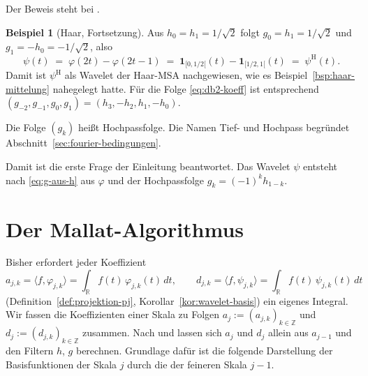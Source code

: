 \documentclass[a4paper,11pt,bibliography=totoc,listof=totoc,headinclude=true,cleardoublepage=empty,oneside]{scrbook}
\newcommand{\quellen}[1]{%
  \par\smallskip
  {\color{uhh_blue}\small\textbf{Belegstellen.}\ #1}%
  \par\medskip}
\theoremstyle{plain}
\theoremstyle{definition}
\newtheorem{Beispiel}[Satz]{Beispiel}
\newcommand{\R}{\mathbb{R}}
\newcommand{\Z}{\mathbb{Z}}
\newcommand{\scal}[2]{\langle #1, #2 \rangle}
\begin{document}
Der Beweis steht bei \cite[Satz~2.2.10]{lmr}. %

\begin{Beispiel}[Haar, Fortsetzung]
\label{bsp:haar-g}
Aus $h_0=h_1=1/\sqrt2$ folgt $g_0 = h_1 = 1/\sqrt2$ und $g_1 = -h_0 = -1/\sqrt2$,
also
\[
  \psi(t) \;=\; \varphi(2t) - \varphi(2t-1) \;=\; \mathbf 1_{[0,1/2[}(t) - \mathbf 1_{[1/2,1[}(t)
  \;=\; \psi^{\mathrm H}(t).
\]
Damit ist $\psi^{\mathrm H}$ als Wavelet der Haar-MSA nachgewiesen, wie es
Beispiel~\ref{bsp:haar-mittelung} nahegelegt hatte. Für die Folge
\eqref{eq:db2-koeff} ist entsprechend
$(g_{-2},g_{-1},g_0,g_1) = (h_3,-h_2,h_1,-h_0)$.
\end{Beispiel}

Die Folge $(g_k)$ hei\ss{}t Hochpassfolge. Die Namen Tief- und Hochpass
begründet Abschnitt~\ref{sec:fourier-bedingungen}.

Damit ist die erste Frage der Einleitung beantwortet. Das Wavelet $\psi$
entsteht nach \eqref{eq:g-aus-h} aus $\varphi$ und der Hochpassfolge
$g_k = (-1)^k h_{1-k}$.

\section{Der Mallat-Algorithmus}
\label{sec:mallat}


Bisher erfordert jeder Koeffizient
\[
  a_{j,k} = \scal{f}{\varphi_{j,k}} = \int_{\R} f(t)\,\varphi_{j,k}(t)\,dt,
  \qquad
  d_{j,k} = \scal{f}{\psi_{j,k}} = \int_{\R} f(t)\,\psi_{j,k}(t)\,dt
\]
(Definition~\ref{def:projektion-pj}, Korollar~\ref{kor:wavelet-basis}) ein
eigenes Integral. Wir fassen die Koeffizienten einer Skala zu Folgen
$a_j := (a_{j,k})_{k\in\Z}$ und $d_j := (d_{j,k})_{k\in\Z}$ zusammen. Nach
\cite[Kap.~5.4]{blatter} %
und \cite[Kap.~2.3, Abb.~2.8]{lmr} %
lassen sich $a_j$ und $d_j$ allein aus $a_{j-1}$ und den Filtern $h$, $g$
berechnen. Grundlage dafür ist die folgende Darstellung der Basisfunktionen der
Skala $j$ durch die der feineren Skala $j-1$.
\end{document}

